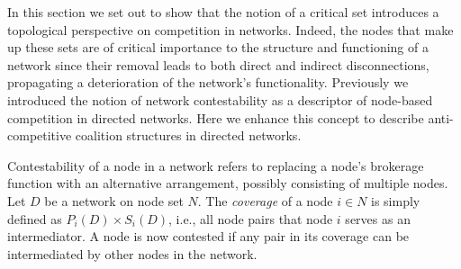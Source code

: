 In this section we set out to show that the notion of a critical set introduces a topological perspective on competition in networks. Indeed, the nodes that make up these sets are of critical importance to the structure and functioning of a network since their removal leads to both direct and indirect disconnections, propagating a deterioration of the network's functionality. Previously we introduced the notion of network contestability as a descriptor of node-based competition in directed networks. Here we enhance this concept to describe anti-competitive coalition structures in directed networks.

Contestability of a node in a network refers to replacing a node's brokerage function with an alternative arrangement, possibly consisting of multiple nodes. Let $D$ be a network on node set $N$. The \emph{coverage} of a node $i \in N$ is simply defined as $P_{i}(D) \times S_{i}(D)$, i.e., all node pairs that node $i$ serves as an intermediator. A node is now contested if any pair in its coverage can be intermediated by other nodes in the network.

